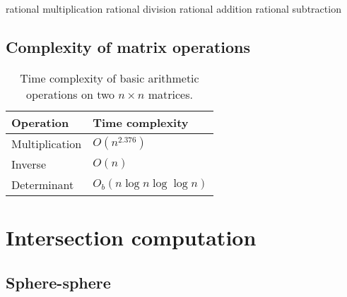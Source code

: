 \documentclass[oneside]{memoir}
\begin{document}
rational multiplication
rational division
rational addition
rational subtraction

\section{Complexity of matrix operations}

\begin{table}[hr]
\caption{Time complexity of basic arithmetic operations on two $n \times n$
matrices.}
\begin{tabular}{ll}
\toprule 
Operation & Time complexity \\
\midrule
Multiplication & $O(n^{2.376})$ \\
Inverse & $O(n)$ \\
Determinant & $O_b(n \log n \log \log n)$ \\
\bottomrule
\end{tabular}
\end{table}

\chapter{Intersection computation}

\section{Sphere-sphere} 
\end{document}
